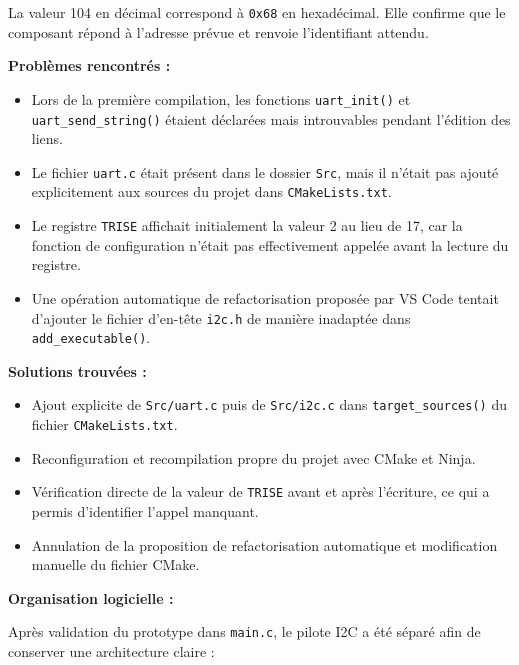 \documentclass[11pt,a4paper]{article}
\begin{document}
\begin{sessionbox}
		La valeur 104 en décimal correspond à \texttt{0x68} en hexadécimal. Elle confirme que le composant répond à l'adresse prévue et renvoie l'identifiant attendu.
		
		\vspace{0.3cm}
		
		\textbf{Problèmes rencontrés :}
		
		\begin{itemize}
			\item Lors de la première compilation, les fonctions \texttt{uart\_init()} et \texttt{uart\_send\_string()} étaient déclarées mais introuvables pendant l'édition des liens.
			\item Le fichier \texttt{uart.c} était présent dans le dossier \texttt{Src}, mais il n'était pas ajouté explicitement aux sources du projet dans \texttt{CMakeLists.txt}.
			\item Le registre \texttt{TRISE} affichait initialement la valeur 2 au lieu de 17, car la fonction de configuration n'était pas effectivement appelée avant la lecture du registre.
			\item Une opération automatique de refactorisation proposée par VS Code tentait d'ajouter le fichier d'en-tête \texttt{i2c.h} de manière inadaptée dans \texttt{add\_executable()}.
		\end{itemize}
		
		\vspace{0.3cm}
		
		\textbf{Solutions trouvées :}
		
		\begin{itemize}
			\item Ajout explicite de \texttt{Src/uart.c} puis de \texttt{Src/i2c.c} dans \texttt{target\_sources()} du fichier \texttt{CMakeLists.txt}.
			\item Reconfiguration et recompilation propre du projet avec CMake et Ninja.
			\item Vérification directe de la valeur de \texttt{TRISE} avant et après l'écriture, ce qui a permis d'identifier l'appel manquant.
			\item Annulation de la proposition de refactorisation automatique et modification manuelle du fichier CMake.
		\end{itemize}
		
		\vspace{0.3cm}
		
		\textbf{Organisation logicielle :}
		
		Après validation du prototype dans \texttt{main.c}, le pilote I2C a été séparé afin de conserver une architecture claire :
		

\end{sessionbox}
\end{document}
